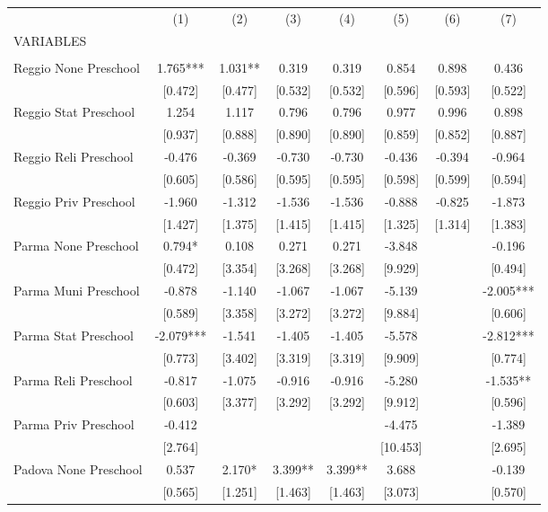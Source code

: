 \begin{tabular}{lccccccc} \hline
 & (1) & (2) & (3) & (4) & (5) & (6) & (7) \\
VARIABLES &  &  &  &  &  &  &  \\ \hline
 &  &  &  &  &  &  &  \\
Reggio None Preschool & 1.765*** & 1.031** & 0.319 & 0.319 & 0.854 & 0.898 & 0.436 \\
 & [0.472] & [0.477] & [0.532] & [0.532] & [0.596] & [0.593] & [0.522] \\
Reggio Stat Preschool & 1.254 & 1.117 & 0.796 & 0.796 & 0.977 & 0.996 & 0.898 \\
 & [0.937] & [0.888] & [0.890] & [0.890] & [0.859] & [0.852] & [0.887] \\
Reggio Reli Preschool & -0.476 & -0.369 & -0.730 & -0.730 & -0.436 & -0.394 & -0.964 \\
 & [0.605] & [0.586] & [0.595] & [0.595] & [0.598] & [0.599] & [0.594] \\
Reggio Priv Preschool & -1.960 & -1.312 & -1.536 & -1.536 & -0.888 & -0.825 & -1.873 \\
 & [1.427] & [1.375] & [1.415] & [1.415] & [1.325] & [1.314] & [1.383] \\
Parma None Preschool & 0.794* & 0.108 & 0.271 & 0.271 & -3.848 &  & -0.196 \\
 & [0.472] & [3.354] & [3.268] & [3.268] & [9.929] &  & [0.494] \\
Parma Muni Preschool & -0.878 & -1.140 & -1.067 & -1.067 & -5.139 &  & -2.005*** \\
 & [0.589] & [3.358] & [3.272] & [3.272] & [9.884] &  & [0.606] \\
Parma Stat Preschool & -2.079*** & -1.541 & -1.405 & -1.405 & -5.578 &  & -2.812*** \\
 & [0.773] & [3.402] & [3.319] & [3.319] & [9.909] &  & [0.774] \\
Parma Reli Preschool & -0.817 & -1.075 & -0.916 & -0.916 & -5.280 &  & -1.535** \\
 & [0.603] & [3.377] & [3.292] & [3.292] & [9.912] &  & [0.596] \\
Parma Priv Preschool & -0.412 &  &  &  & -4.475 &  & -1.389 \\
 & [2.764] &  &  &  & [10.453] &  & [2.695] \\
Padova None Preschool & 0.537 & 2.170* & 3.399** & 3.399** & 3.688 &  & -0.139 \\
 & [0.565] & [1.251] & [1.463] & [1.463] & [3.073] &  & [0.570] \\

\end{tabular}
